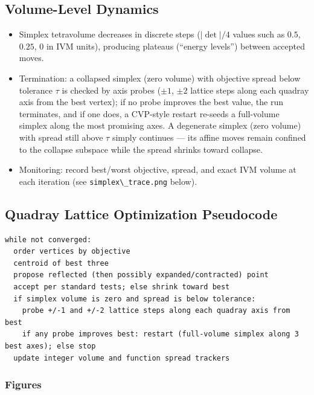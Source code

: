\documentclass[
  10pt,
]{article}
\newcommand{\passthrough}[1]{#1}
\providecommand{\tightlist}{%
  \setlength{\itemsep}{0pt}\setlength{\parskip}{0pt}}
\begin{document}
\subsection{Volume-Level Dynamics}\label{volume-level-dynamics}

\begin{itemize}
\tightlist
\item
  Simplex tetravolume decreases in discrete steps
  (\(\lvert\det\rvert/4\) values such as \(0.5\), \(0.25\), \(0\) in IVM
  units), producing plateaus (``energy levels'') between accepted moves.
\item
  Termination: a collapsed simplex (zero volume) with objective spread
  below tolerance \(\tau\) is checked by axis probes (\(\pm 1\),
  \(\pm 2\) lattice steps along each quadray axis from the best vertex);
  if no probe improves the best value, the run terminates, and if one
  does, a CVP-style restart re-seeds a full-volume simplex along the
  most promising axes. A degenerate simplex (zero volume) with spread
  still above \(\tau\) simply continues --- its affine moves remain
  confined to the collapse subspace while the spread shrinks toward
  collapse.
\item
  Monitoring: record best/worst objective, spread, and exact IVM volume
  at each iteration (see \passthrough{\lstinline!simplex\_trace.png!}
  below).
\end{itemize}

\subsection{Quadray Lattice Optimization
Pseudocode}\label{code:nelder_mead_on_integer_lattice}

\begin{lstlisting}
while not converged:
  order vertices by objective
  centroid of best three
  propose reflected (then possibly expanded/contracted) point
  accept per standard tests; else shrink toward best
  if simplex volume is zero and spread is below tolerance:
    probe +/-1 and +/-2 lattice steps along each quadray axis from best
    if any probe improves best: restart (full-volume simplex along 3 best axes); else stop
  update integer volume and function spread trackers
\end{lstlisting}

\subsubsection{Figures}\label{figures}
\end{document}

